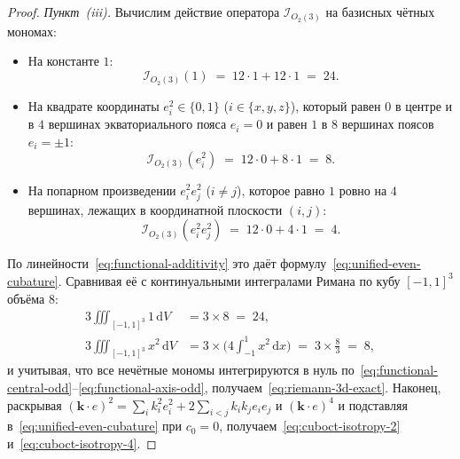 \documentclass[11pt,a4paper]{article}
\theoremstyle{plain}
\theoremstyle{definition}
\begin{document}
\begin{proof}
\emph{Пункт~(iii).} Вычислим действие оператора $\mathcal{I}_{O_2(3)}$ на базисных чётных мономах:
\begin{itemize}[leftmargin=*]
\item На константе $1$:
  \begin{equation*}
    \mathcal{I}_{O_2(3)}(1) \;=\; 12\cdot 1 + 12\cdot 1 \;=\; 24.
  \end{equation*}
\item На квадрате координаты $e_i^2 \in \{0, 1\}$ ($i \in \{x, y, z\}$), который равен $0$ в центре и в $4$ вершинах экваториального пояса $e_i = 0$ и равен $1$ в $8$ вершинах поясов $e_i = \pm 1$:
  \begin{equation*}
    \mathcal{I}_{O_2(3)}(e_i^2) \;=\; 12\cdot 0 + 8\cdot 1 \;=\; 8.
  \end{equation*}
\item На попарном произведении $e_i^2 e_j^2$ ($i \ne j$), которое равно $1$ ровно на $4$ вершинах, лежащих в координатной плоскости $(i, j)$:
  \begin{equation*}
    \mathcal{I}_{O_2(3)}(e_i^2 e_j^2) \;=\; 12\cdot 0 + 4\cdot 1 \;=\; 4.
  \end{equation*}
\end{itemize}
По линейности~\eqref{eq:functional-additivity} это даёт формулу~\eqref{eq:unified-even-cubature}. Сравнивая её с континуальными интегралами Римана по кубу $[-1, 1]^3$ объёма $8$:
\begin{align*}
  3\iiint_{[-1,1]^3} 1\,\mathrm{d}V &= 3 \times 8 \;=\; 24, \\
  3\iiint_{[-1,1]^3} x^2\,\mathrm{d}V &= 3 \times \biggl(4\int_{-1}^{1} x^2\,\mathrm{d}x\biggr) \;=\; 3 \times \frac{8}{3} \;=\; 8,
\end{align*}
и учитывая, что все нечётные мономы интегрируются в нуль по~\eqref{eq:functional-central-odd}--\eqref{eq:functional-axis-odd}, получаем~\eqref{eq:riemann-3d-exact}. Наконец, раскрывая $(\mathbf{k}\cdot e)^2 = \sum_i k_i^2 e_i^2 + 2\sum_{i<j} k_i k_j e_i e_j$ и $(\mathbf{k}\cdot e)^4$ и подставляя в~\eqref{eq:unified-even-cubature} при $c_0 = 0$, получаем~\eqref{eq:cuboct-isotropy-2} и~\eqref{eq:cuboct-isotropy-4}.
\end{proof}
\end{document}
